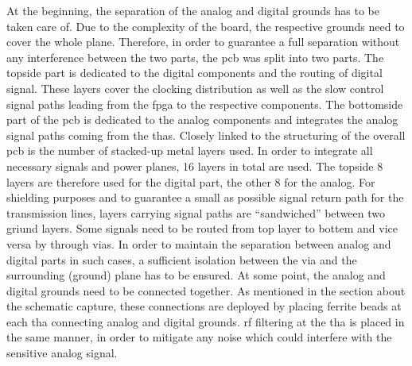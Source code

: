 At the beginning, the separation of the analog and digital grounds has to be taken care of. 
Due to the complexity of the board, the respective grounds need to cover the whole plane. 
Therefore, in order to guarantee a full separation without any interference between the two parts, the \gls{pcb} was split into two parts.
The topside part is dedicated to the digital components and the routing of digital signal. 
These layers cover the clocking distribution as well as the slow control signal paths leading from the \gls{fpga} to the respective components.
The bottomside part of the \gls{pcb} is dedicated to the analog components and integrates the analog signal paths coming from the \glspl{tha}.
Closely linked to the structuring of the overall \gls{pcb} is the number of stacked-up metal layers used.
In order to integrate all necessary signals and power planes, 16 layers in total are used.
The topside 8 layers are therefore used for the digital part, the other 8 for the analog.
For shielding purposes and to guarantee a small as possible signal return path for the transmission lines, layers carrying signal paths are ``sandwiched'' between two griund layers.
Some signals need to be routed from top layer to bottem and vice versa by through vias. 
In order to maintain the separation between analog and digital parts in such cases, a sufficient isolation between the via and the surrounding (ground) plane has to be ensured.
At some point, the analog and digital grounds need to be connected together. 
As mentioned in the section about the schematic capture, these connections are deployed by placing ferrite beads at each \gls{tha} connecting analog and digital grounds. 
\gls{rf} filtering at the \gls{tha} is placed in the same manner, in order to mitigate any noise which could interfere with the sensitive analog signal.

